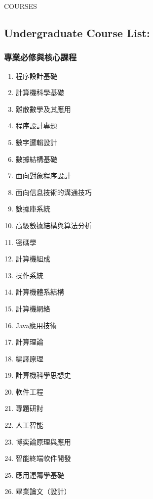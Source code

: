 \documentclass{resume}
\begin{document}
\vspace{-1em}
\begin{rSection}{COURSES}
\subsection*{Undergraduate Course List:}

\noindent
\begin{minipage}[t]{0.31\textwidth}
    \subsubsection*{專業必修與核心課程}
    \begin{enumerate}
        \item 程序設計基礎
        \item 計算機科學基礎
        \item 離散數學及其應用
        \item 程序設計專題
        \item 數字邏輯設計
        \item 數據結構基礎
        \item 面向對象程序設計
        \item 面向信息技術的溝通技巧
        \item 數據庫系統
        \item 高級數據結構與算法分析
        \item 密碼學
        \item 計算機組成
        \item 操作系統
        \item 計算機體系結構
        \item 計算機網絡
        \item Java應用技術
        \item 計算理論
        \item 編譯原理
        \item 計算機科學思想史
        \item 軟件工程
        \item 專題研討
        \item 人工智能
        \item 博奕論原理與應用
        \item 智能終端軟件開發
        \item 應用運籌學基礎
        \item 畢業論文（設計）
    \end{enumerate}
\end{minipage}\hfill
\begin{minipage}[t]{0.31\textwidth}

\end{minipage}
\end{rSection}
\end{document}
